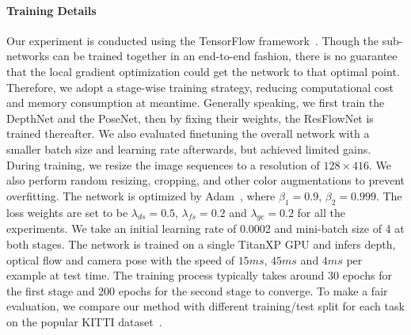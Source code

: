\documentclass[10pt,twocolumn,letterpaper]{article}
\newcommand{\jpshi}[1]{{{\color{blue} Jianping: #1}}}
\begin{document}
\paragraph{Training Details} Our experiment is conducted using the TensorFlow framework~\cite{abadi2016tensorflow}. Though the sub-networks can be trained together in an end-to-end fashion, there is no guarantee that the local gradient optimization could get the network to that optimal point. Therefore, we adopt a stage-wise training strategy, reducing computational cost and memory consumption at meantime. Generally speaking, we first train the DepthNet and the PoseNet, then by fixing their weights, the ResFlowNet is trained thereafter. We also evaluated finetuning the overall network with a smaller batch size and learning rate afterwards, but achieved limited gains. %
During training, we resize the image sequences to a resolution of $128\times 416$. We also perform random resizing, cropping, and other color augmentations to prevent overfitting. The network is optimized by Adam~\cite{kingma2014adam}, where $\beta_1=0.9$, $\beta_2=0.999$. 
The loss weights are set to be $\lambda_{ds}=0.5$, $\lambda_{fs}=0.2$ and $\lambda_{gc}=0.2$ for all the experiments.
We take an initial learning rate of 0.0002 and mini-batch size of 4 at both stages. 
The network is trained on a single TitanXP GPU and infers depth, optical flow and camera pose with the speed of $15ms$, $45ms$ and $4ms$ per example at test time. 
The training process typically takes around 30 epochs for the first stage and 200 epochs for the second stage to converge. %
To make a fair evaluation, we compare our method with different training/test split for each task on the popular KITTI dataset~\cite{Menze2015CVPR}. %
\end{document}
